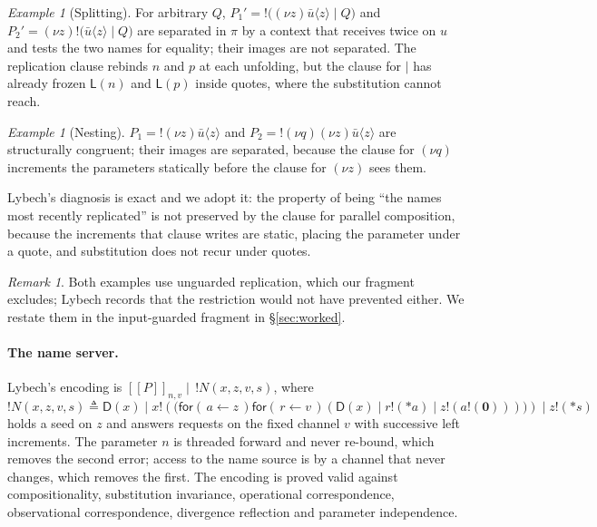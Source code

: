\documentclass[11pt]{article}
\theoremstyle{definition}
\theoremstyle{plain}
\theoremstyle{remark}
\newtheorem{remark}[definition]{Remark}
\newtheorem{example}[definition]{Example}
\newcommand{\drp}[1]{{*}#1}
\newcommand{\inp}[3]{\mathsf{for}(\,#1 \leftarrow #2\,)#3}
\newcommand{\out}[2]{#1!(#2)}
\newcommand{\enc}[1]{[\![#1]\!]}
\newcommand{\nil}{\mathbf{0}}
\newcommand{\Lft}{\mathsf{L}}
\newcommand{\Dup}{\mathsf{D}}
\begin{document}
\begin{example}[Splitting]\label{ex:ce1}
For arbitrary $Q$,
$P_1' = !\big((\nu z)\bar u\langle z\rangle \mid Q\big)$ and
$P_2' = (\nu z)!\big(\bar u\langle z\rangle \mid Q\big)$
are separated in $\pi$ by a context that receives twice on $u$ and tests
the two names for equality; their images are not separated. The
replication clause rebinds $n$ and $p$ at each unfolding, but the clause
for $\mid$ has already frozen $\Lft(n)$ and $\Lft(p)$ inside quotes,
where the substitution cannot reach.
\end{example}

\begin{example}[Nesting]\label{ex:ce2}
$P_1 = !(\nu z)\bar u\langle z\rangle$ and
$P_2 = !(\nu q)(\nu z)\bar u\langle z\rangle$ are structurally
congruent; their images are separated, because the clause for $(\nu q)$
increments the parameters statically before the clause for $(\nu z)$ sees
them.
\end{example}

Lybech's diagnosis is exact and we adopt it: the property of being ``the
names most recently replicated'' is not preserved by the clause for
parallel composition, because the increments that clause writes are
static, placing the parameter under a quote, and substitution does not
recur under quotes.

\begin{remark}\label{rem:guarded}
Both examples use unguarded replication, which our fragment excludes;
Lybech records that the restriction would not have prevented either. We
restate them in the input-guarded fragment in \S\ref{sec:worked}.
\end{remark}

\paragraph{The name server.}
Lybech's encoding is $\enc{P}_{n,v} \mid\, !N(x,z,v,s)$, where
\[
  !N(x,z,v,s) \triangleq
  \Dup(x) \mid \out{x}{\big(\inp{a}{z}{\inp{r}{v}{(\Dup(x) \mid \out{r}{\drp{a}} \mid \out{z}{\out{a}{\nil}})}}\big)}
  \mid \out{z}{\drp{s}}
\]
holds a seed on $z$ and answers requests on the fixed channel $v$ with
successive left increments. The parameter $n$ is threaded forward and
never re-bound, which removes the second error; access to the name source
is by a channel that never changes, which removes the first. The
encoding is proved valid against compositionality, substitution
invariance, operational correspondence, observational correspondence,
divergence reflection and parameter independence.
\end{document}
